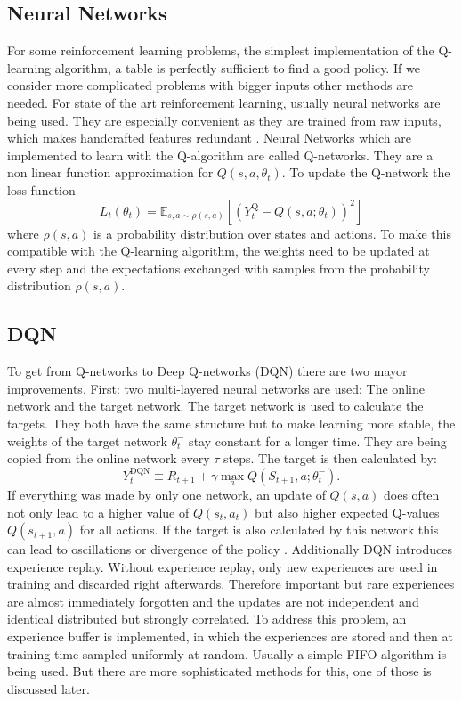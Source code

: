 \documentclass[12pt]{article}
\begin{document}
\subsection{Neural Networks}
For some reinforcement learning problems, the simplest implementation of the Q-learning algorithm, a table is perfectly sufficient to find a good policy.
If we consider more complicated problems with bigger inputs other methods are needed. For state of the art reinforcement learning, usually neural networks are being used. %
They are especially convenient as they are trained from raw inputs, which makes handcrafted features redundant \cite{DBLP:journals/corr/MnihKSGAWR13}.
Neural Networks which are implemented to learn with the Q-algorithm are called Q-networks.
They are a non linear function approximation for $Q(s,a,\theta_t)$.
To update the Q-network the loss function
\begin{equation}
L_{t}\left(\theta_{t}\right)=\mathbb{E}_{s, a \sim \rho(s,a)}\left[\left(Y_{t}^{\mathrm{Q}}-Q\left(s, a ; \theta_{t}\right)\right)^{2}\right]
\end{equation}
where $\rho(s, a)$ is a probability distribution over states and actions. To make this compatible with the Q-learning algorithm, the weights need to be updated at every step and the expectations exchanged with samples from the probability distribution $\rho(s,a)$.

\subsection{DQN}
To get from Q-networks to Deep Q-networks (DQN) there are two mayor improvements.
First: two multi-layered neural networks are used: The online network and the target network. The target network is used to calculate the targets. They both have the same structure but to make learning more stable, the weights of the target network $\theta_t^-$ stay constant for a longer time. 
They are being copied from the online network every $\tau$ steps.
The target is then calculated by:
\begin{equation}
Y_{t}^{\mathrm{DQN}} \equiv R_{t+1}+\gamma \max _{a} Q\left(S_{t+1}, a ; \theta_{t}^{-}\right).
\end{equation}
If everything was made by only one network, an update of $Q(s,a)$ does often not only lead to a higher value of $Q(s_t,a_t)$ but also higher expected Q-values $Q(s_{t+1},a)$ for all actions. If the target is also calculated by this network this can lead to oscillations or divergence of the policy \cite{DBLP:journals/corr/MnihKSGAWR13}.
Additionally DQN introduces experience replay. Without experience replay, only new experiences are used in training and discarded right afterwards.
Therefore important but rare experiences are almost immediately forgotten and the updates are not independent and identical distributed but strongly correlated.
To address this problem, an experience buffer is implemented, in which the experiences are stored and then at training time sampled uniformly at random. Usually a simple FIFO algorithm is being used. But there are more sophisticated methods for this, one of those is discussed later.
\end{document}
